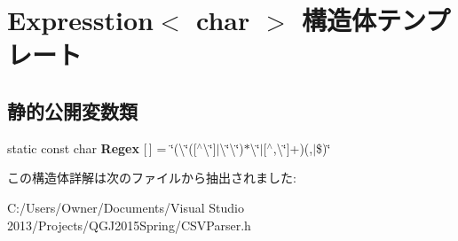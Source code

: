 \hypertarget{struct_expresstion_3_01char_01_4}{}\section{Expresstion$<$ char $>$ 構造体テンプレート}
\label{struct_expresstion_3_01char_01_4}
\subsection*{静的公開変数類}
\begin{DoxyCompactItemize}
\item 
static const char {\bfseries Regex} \mbox{[}$\,$\mbox{]} = \char`\"{}(\textbackslash{}\char`\"{}(\mbox{[}$^\wedge$\textbackslash{}\char`\"{}\mbox{]}$\vert$\textbackslash{}\char`\"{}\textbackslash{}\char`\"{})$\ast$\textbackslash{}\char`\"{}$\vert$\mbox{[}$^\wedge$,\textbackslash{}\char`\"{}\mbox{]}+)(,$\vert$\$)\char`\"{}\hypertarget{struct_expresstion_3_01char_01_4_ac68d5baf6a841c12188089d1e872195e}{}\label{struct_expresstion_3_01char_01_4_ac68d5baf6a841c12188089d1e872195e}

\end{DoxyCompactItemize}


この構造体詳解は次のファイルから抽出されました\+:\begin{DoxyCompactItemize}
\item 
C\+:/\+Users/\+Owner/\+Documents/\+Visual Studio 2013/\+Projects/\+Q\+G\+J2015\+Spring/C\+S\+V\+Parser.\+h\end{DoxyCompactItemize}
